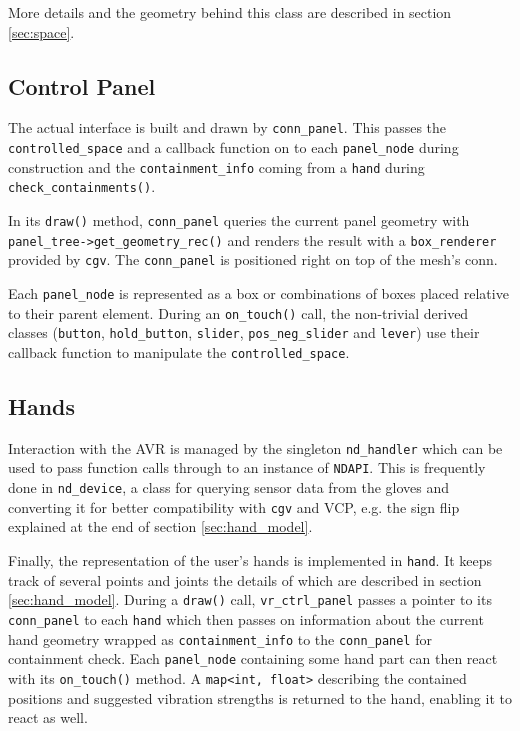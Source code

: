 \documentclass[hyperref, bachelorofscience]{cgvpub}
\begin{document}
More details and the geometry behind this class are described in section \ref{sec:space}.

\subsection{Control Panel}
The actual interface is built and drawn by \lstinline|conn_panel|. This passes the \lstinline|controlled_space| and a callback function on to each \lstinline|panel_node| during construction and the \lstinline|containment_info| coming from a \lstinline|hand| during \lstinline|check_containments()|. 

In its \lstinline|draw()| method, \lstinline|conn_panel| queries the current panel geometry with \lstinline|panel_tree->get_geometry_rec()| and renders the result with a \lstinline|box_renderer| provided by \lstinline|cgv|. The \lstinline|conn_panel| is positioned right on top of the mesh's conn.

Each \lstinline|panel_node| is represented as a box or combinations of boxes placed relative to their parent element. During an \lstinline|on_touch()| call, the non-trivial derived classes (\lstinline|button|, \lstinline|hold_button|, \lstinline|slider|, \lstinline|pos_neg_slider| and \lstinline|lever|) use their callback function to manipulate the \lstinline|controlled_space|. 

\subsection{Hands} \label{sec:devel:structure:hands}
Interaction with the \Gls{AVR} is managed by the singleton \lstinline|nd_handler| which can be used to pass function calls through to an instance of \lstinline|NDAPI|. This is frequently done in \lstinline|nd_device|, a class for querying sensor data from the gloves and converting it for better compatibility with \lstinline|cgv| and \gls{VCP}, e.g. the sign flip explained at the end of section \ref{sec:hand_model}.

Finally, the representation of the user's hands is implemented in \lstinline|hand|. It keeps track of several points and joints the details of which are described in section \ref{sec:hand_model}. During a \lstinline|draw()| call, \lstinline|vr_ctrl_panel| passes a pointer to its \lstinline|conn_panel| to each \lstinline|hand| which then passes on information about the current hand geometry wrapped as \lstinline|containment_info| to the \lstinline|conn_panel| for containment check. Each \lstinline|panel_node| containing some hand part can then react with its \lstinline|on_touch()| method. A \lstinline|map<int, float>| describing the contained positions and suggested vibration strengths is returned to the hand, enabling it to react as well.
\end{document}

